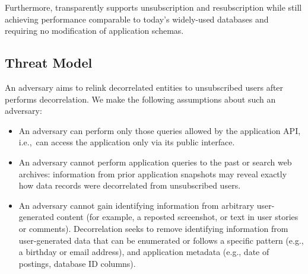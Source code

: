 Furthermore, \sys transparently supports unsubscription and resubscription while still achieving performance
comparable to today’s widely-used databases and requiring no modification of application schemas.


\subsection{Threat Model}
An adversary aims to relink decorrelated entities to unsubscribed users after \sys
performs decorrelation. We make the following assumptions about such an adversary:
\begin{itemize}
    \item An adversary can perform only those queries allowed by the application API,
i.e.,\ can access the application only via its public interface.

    \item An adversary cannot perform application queries to the past or search web archives:
    information from prior application snapshots may reveal
    exactly how data records were decorrelated from unsubscribed users.

    \item An adversary cannot gain identifying information from arbitrary user-generated content (for
        example, a reposted screenshot, or text in user stories or comments). Decorrelation seeks to
        remove identifying information from user-generated data that can be enumerated or follows a
        specific pattern (e.g., a birthday or email address), and application metadata (e.g., date
        of postings, database ID columns).
\end{itemize}
